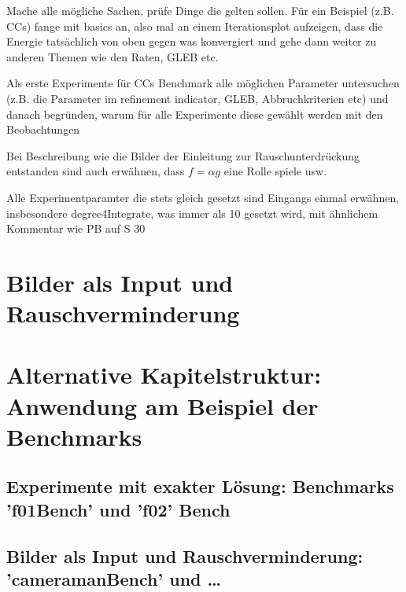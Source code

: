 Mache alle mögliche Sachen, prüfe Dinge die gelten sollen. Für ein
Beispiel (z.B. CCs) fange mit basics an, also mal an einem Iterationsplot
aufzeigen, dass die Energie tatsächlich von oben gegen was konvergiert und 
gehe dann weiter zu anderen Themen wie den Raten, GLEB etc.



\bigskip
Als erste Experimente für CCs Benchmark alle möglichen Parameter untersuchen 
(z.B. die Parameter im refinement indicator, GLEB, Abbruchkriterien etc)
und danach begründen, warum für alle Experimente diese gewählt werden mit
den Beobachtungen

\bigskip
Bei Beschreibung wie die Bilder der Einleitung zur Rauschunterdrückung
entstanden sind auch erwähnen, dass $f=\alpha g$ eine Rolle spiele usw.

\bigskip

Alle Experimentparamter die stets gleich gesetzt sind Eingangs einmal erwähnen,
insbesondere degree4Integrate, was immer als 10 gesetzt wird, mit ähnlichem 
Kommentar wie PB auf S 30
\section{Bilder als Input und Rauschverminderung}
\section{Alternative Kapitelstruktur: Anwendung am Beispiel der Benchmarks}
\subsection{Experimente mit exakter Lösung: Benchmarks 'f01Bench' und 'f02'
Bench}

\subsection{Bilder als Input und Rauschverminderung: 'cameramanBench' und
\ldots}

